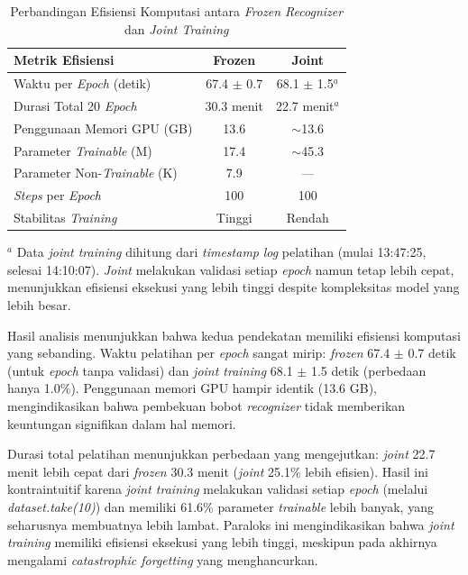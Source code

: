 \documentclass[12pt,a4paper]{article}
\begin{document}
\begin{table}[H]
\centering
\caption{Perbandingan Efisiensi Komputasi antara \textit{Frozen Recognizer} dan \textit{Joint Training}}
\label{tab:frozen-vs-joint-efficiency}
\begin{tabular}{lcc}
\toprule
\textbf{Metrik Efisiensi} & \textbf{Frozen} & \textbf{Joint} \\
\midrule
Waktu per \textit{Epoch} (detik) & 67.4 $\pm$ 0.7 & 68.1 $\pm$ 1.5$^{a}$ \\
Durasi Total 20 \textit{Epoch} & 30.3 menit & 22.7 menit$^{a}$ \\
Penggunaan Memori GPU (GB) & 13.6 & $\sim$13.6 \\
Parameter \textit{Trainable} (M) & 17.4 & $\sim$45.3 \\
Parameter Non-\textit{Trainable} (K) & 7.9 & --- \\
\textit{Steps} per \textit{Epoch} & 100 & 100 \\
Stabilitas \textit{Training} & Tinggi & Rendah \\
\bottomrule
\end{tabular}
\end{table}

$^{a}$ Data \textit{joint training} dihitung dari \textit{timestamp} \textit{log} pelatihan (mulai 13:47:25, selesai 14:10:07). \textit{Joint} melakukan validasi setiap \textit{epoch} namun tetap lebih cepat, menunjukkan efisiensi eksekusi yang lebih tinggi despite kompleksitas model yang lebih besar.

Hasil analisis menunjukkan bahwa kedua pendekatan memiliki efisiensi komputasi yang sebanding. Waktu pelatihan per \textit{epoch} sangat mirip: \textit{frozen} 67.4 $\pm$ 0.7 detik (untuk \textit{epoch} tanpa validasi) dan \textit{joint training} 68.1 $\pm$ 1.5 detik (perbedaan hanya 1.0\%). Penggunaan memori GPU hampir identik (13.6 GB), mengindikasikan bahwa pembekuan bobot \textit{recognizer} tidak memberikan keuntungan signifikan dalam hal memori.

Durasi total pelatihan menunjukkan perbedaan yang mengejutkan: \textit{joint} 22.7 menit lebih cepat dari \textit{frozen} 30.3 menit (\textit{joint} 25.1\% lebih efisien). Hasil ini kontraintuitif karena \textit{joint training} melakukan validasi setiap \textit{epoch} (melalui \textit{dataset.take(10)}) dan memiliki 61.6\% parameter \textit{trainable} lebih banyak, yang seharusnya membuatnya lebih lambat. Paraloks ini mengindikasikan bahwa \textit{joint training} memiliki efisiensi eksekusi yang lebih tinggi, meskipun pada akhirnya mengalami \textit{catastrophic forgetting} yang menghancurkan. 
\end{document}
